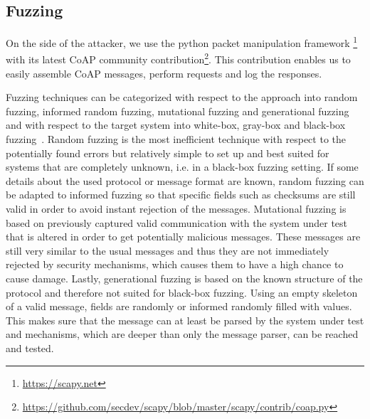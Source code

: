 \subsection{Fuzzing}

On the side of the attacker, we use the python packet manipulation framework \scapy\footnote{\url{https://scapy.net}} with its latest CoAP community contribution\footnote{\url{https://github.com/secdev/scapy/blob/master/scapy/contrib/coap.py}}. This contribution enables us to easily assemble CoAP messages, perform requests and log the responses.

Fuzzing techniques can be categorized with respect to the approach into random fuzzing, informed random fuzzing, mutational fuzzing and generational fuzzing and with respect to the target system into white-box, gray-box and black-box fuzzing~\cite{neystadtPenTesting}.
Random fuzzing is the most inefficient technique with respect to the potentially found errors but relatively simple to set up and best suited for systems that are completely unknown, i.e. in a black-box fuzzing setting. If some details about the used protocol or message format are known, random fuzzing can be adapted to informed fuzzing so that specific fields such as checksums are still valid in order to avoid instant rejection of the messages.
Mutational fuzzing is based on previously captured valid communication with the system under test that is altered in order to get potentially malicious messages. These messages are still very similar to the usual messages and thus they are not immediately rejected by security mechanisms, which causes them to have a high chance to cause damage.
Lastly, generational fuzzing is based on the known structure of the protocol and therefore not suited for black-box fuzzing. Using an empty skeleton of a valid message, fields are randomly or informed randomly filled with values. This makes sure that the message can at least be parsed by the system under test and mechanisms, which are deeper than only the message parser, can be reached and tested.
